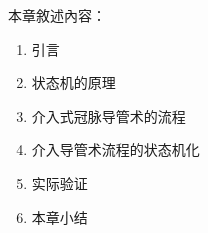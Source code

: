 本章敘述內容：
\begin{enumerate}
  \item 引言
  \item 状态机的原理
  \item 介入式冠脉导管术的流程
  \item 介入导管术流程的状态机化
  \item 实际验证
  \item 本章小结
\end{enumerate}